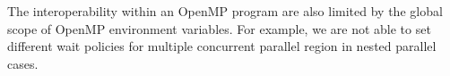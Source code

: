 The interoperability within an OpenMP program are also limited by the global scope of 
OpenMP environment variables. For example, we are not able to set different wait policies for 
multiple concurrent {\sf parallel} region in nested parallel cases. 
